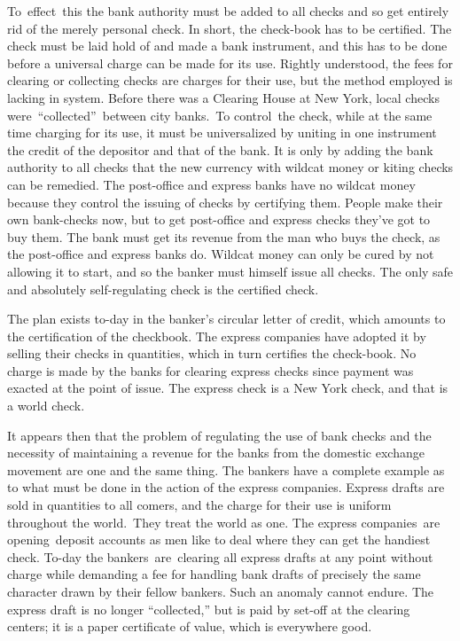 \documentclass[openany,nobib]{tufte-book}
\begin{document}
To~effect~this the bank authority must be added to all checks and so
get entirely rid of the merely personal check. In short, the check-book
has to be certified. The check must be laid hold of and made a bank
instrument, and this has to be done before a universal charge can be
made for its use. Rightly understood, the fees for clearing or
collecting checks are charges for their use, but the method employed is
lacking in system. Before there was a Clearing House at New York, local
checks were~``collected''~between city banks.~To control~the check,
while at the same time charging for its use, it must be universalized by
uniting in one instrument the credit of the depositor and that of the
bank. It is only by adding the bank authority to all checks that the new
currency with wildcat money or kiting checks can be remedied. The
post-office and express banks have no wildcat money because they control
the issuing of checks by certifying them. People make their own
bank-checks now, but to get post-office and express checks they've got
to buy them. The bank must get its revenue from the man who buys the
check, as the post-office and express banks do. Wildcat money can only
be cured by not allowing it to start, and so the banker must himself
issue all checks. The only safe and absolutely self-regulating check is
the certified check.~

The plan exists to-day in the banker's circular letter of credit, which
amounts to the certification of the checkbook. The express companies
have adopted it by selling their checks in quantities, which in turn
certifies the check-book. No charge is made by the banks for clearing
express checks since payment was exacted at the point of issue. The
express check is a New York check, and that is a world check.~

It appears then that the problem of regulating the use of bank checks
and the necessity of maintaining a revenue for the banks from the
domestic exchange movement are one and the same thing. The bankers have
a complete example as to what must be done in the action of the express
companies. Express drafts are sold in quantities to all comers, and the
charge for their use is uniform throughout the world.~They treat the
world as one. The express companies~are opening~deposit accounts as men
like to deal where they can get the handiest check. To-day the
bankers~are~clearing all express drafts at any point without charge
while demanding a fee for handling bank drafts of precisely the same
character drawn by their fellow bankers. Such an anomaly cannot endure.
The express draft is no longer ``collected,'' but is paid by set-off at
the clearing centers; it is a paper certificate of value, which is
everywhere good. ~
\end{document}
